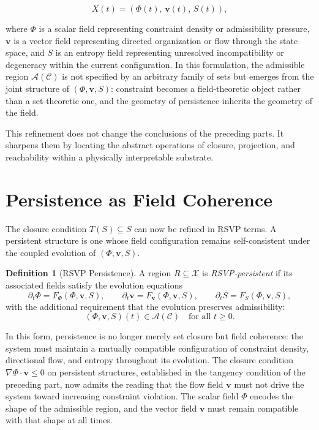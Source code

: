 \documentclass[12pt, a4paper, oneside]{article}
\theoremstyle{plain}
\theoremstyle{definition}
\newtheorem{definition}[theorem]{Definition}
\theoremstyle{remark}
\newcommand{\X}{\mathcal{X}}
\newcommand{\C}{\mathcal{C}}
\newcommand{\A}{\mathcal{A}}
\newcommand{\T}{T}
\begin{document}
\begin{equation}
X(t) = (\Phi(t),\, \mathbf{v}(t),\, S(t)),
\end{equation}

where $\Phi$ is a scalar field representing constraint density or admissibility pressure, $\mathbf{v}$ is a vector field representing directed organization or flow through the state space, and $S$ is an entropy field representing unresolved incompatibility or degeneracy within the current configuration. In this formulation, the admissible region $\A(\C)$ is not specified by an arbitrary family of sets but emerges from the joint structure of $(\Phi, \mathbf{v}, S)$: constraint becomes a field-theoretic object rather than a set-theoretic one, and the geometry of persistence inherits the geometry of the field.

This refinement does not change the conclusions of the preceding parts. It sharpens them by locating the abstract operations of closure, projection, and reachability within a physically interpretable substrate.

\section{Persistence as Field Coherence}

The closure condition $\T(S) \subseteq S$ can now be refined in RSVP terms. A persistent structure is one whose field configuration remains self-consistent under the coupled evolution of $(\Phi, \mathbf{v}, S)$.

\begin{definition}[RSVP Persistence]
A region $R \subseteq \X$ is \emph{RSVP-persistent} if its associated fields satisfy the evolution equations
\begin{equation}
\partial_t \Phi = F_\Phi(\Phi, \mathbf{v}, S), \qquad
\partial_t \mathbf{v} = F_{\mathbf{v}}(\Phi, \mathbf{v}, S), \qquad
\partial_t S = F_S(\Phi, \mathbf{v}, S),
\end{equation}
with the additional requirement that the evolution preserves admissibility:
\begin{equation}
(\Phi, \mathbf{v}, S)(t) \in \A(\C) \quad \text{for all } t \geq 0.
\end{equation}
\end{definition}

In this form, persistence is no longer merely set closure but field coherence: the system must maintain a mutually compatible configuration of constraint density, directional flow, and entropy throughout its evolution. The closure condition $\nabla \Phi \cdot \mathbf{v} \leq 0$ on persistent structures, established in the tangency condition of the preceding part, now admits the reading that the flow field $\mathbf{v}$ must not drive the system toward increasing constraint violation. The scalar field $\Phi$ encodes the shape of the admissible region, and the vector field $\mathbf{v}$ must remain compatible with that shape at all times.
\end{document}
